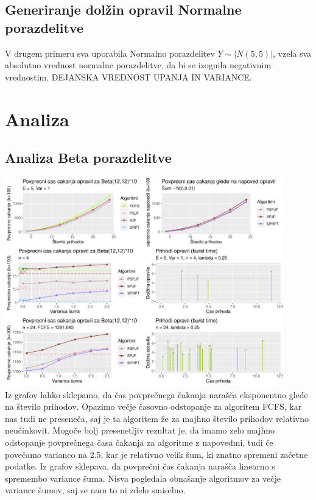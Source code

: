 \documentclass[a4paper, pt14]{article}
\begin{document}
\subsection{Generiranje dolžin opravil Normalne porazdelitve}
V drugem primeru sva uporabila Normalno porazdelitev $Y \sim |N(5,5)|$, vzela sva absolutno vrednost normalne porazdelitve, da bi se izognila negativnim vrednostim. DEJANSKA VREDNOST UPANJA IN VARIANCE. 

\section{Analiza}
\subsection{Analiza Beta porazdelitve}
\includegraphics[width=12.1cm,keepaspectratio]{Beta_grafi.pdf}
\\Iz grafov lahko sklepamo, da čas povprečnega čakanja narašča eksponentno glede na število prihodov. Opazimo večje časovno odstopanje za algoritem FCFS, kar nas tudi ne preseneča, saj je ta algoritem že za majhno število prihodov relativno neučinkovit. Mogoče bolj presenetljiv rezultat je, da imamo zelo majhno odstopanje povprečnega časa čakanja za algoritme z napovedmi, tudi če povečamo varianco na 2.5, kar je relativno velik šum, ki znatno spremeni začetne podatke. Iz grafov sklepava, da povprečni čas čakanja narašča linearno s spremembo variance šuma. Nisva pogledala obnašanje algoritmov za večje variance šumov, saj se nam to ni zdelo smiselno.\\
\end{document}
